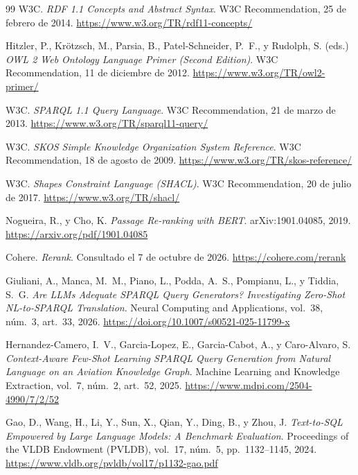 \documentclass[11pt, a4paper]{report}
\begin{document}
\begin{thebibliography}{99}
		W3C.
		\textit{RDF 1.1 Concepts and Abstract Syntax}. W3C Recommendation, 25 de
		febrero de 2014.
		\url{https://www.w3.org/TR/rdf11-concepts/}

		Hitzler, P., Krötzsch, M., Parsia, B., Patel-Schneider, P.~F., y
		Rudolph, S. (eds.)
		\textit{OWL 2 Web Ontology Language Primer (Second Edition)}. W3C
		Recommendation, 11 de diciembre de 2012.
		\url{https://www.w3.org/TR/owl2-primer/}

		W3C.
		\textit{SPARQL 1.1 Query Language}. W3C Recommendation, 21 de marzo de
		2013.
		\url{https://www.w3.org/TR/sparql11-query/}

		W3C.
		\textit{SKOS Simple Knowledge Organization System Reference}. W3C
		Recommendation, 18 de agosto de 2009.
		\url{https://www.w3.org/TR/skos-reference/}

		W3C.
		\textit{Shapes Constraint Language (SHACL)}. W3C Recommendation, 20 de
		julio de 2017.
		\url{https://www.w3.org/TR/shacl/}

		Nogueira, R., y Cho, K.
		\textit{Passage Re-ranking with BERT}. arXiv:1901.04085, 2019.
		\url{https://arxiv.org/pdf/1901.04085}

		Cohere.
		\textit{Rerank}. Consultado el 7 de octubre de 2026.
		\url{https://cohere.com/rerank}

		Giuliani, A., Manca, M.~M., Piano, L., Podda, A.~S., Pompianu, L., y
		Tiddia, S.~G.
		\textit{Are LLMs Adequate SPARQL Query Generators? Investigating
		Zero-Shot NL-to-SPARQL Translation}. Neural Computing and
		Applications, vol.~38, núm.~3, art.~33, 2026.
		\url{https://doi.org/10.1007/s00521-025-11799-x}

		Hernandez-Camero, I.~V., Garcia-Lopez, E., Garcia-Cabot, A., y
		Caro-Alvaro, S.
		\textit{Context-Aware Few-Shot Learning SPARQL Query Generation from
		Natural Language on an Aviation Knowledge Graph}. Machine Learning
		and Knowledge Extraction, vol.~7, núm.~2, art.~52, 2025.
		\url{https://www.mdpi.com/2504-4990/7/2/52}

		Gao, D., Wang, H., Li, Y., Sun, X., Qian, Y., Ding, B., y Zhou, J.
		\textit{Text-to-SQL Empowered by Large Language Models: A Benchmark
		Evaluation}. Proceedings of the VLDB Endowment (PVLDB), vol.~17,
		núm.~5, pp.~1132--1145, 2024.
		\url{https://www.vldb.org/pvldb/vol17/p1132-gao.pdf}


\end{thebibliography}
\end{document}
